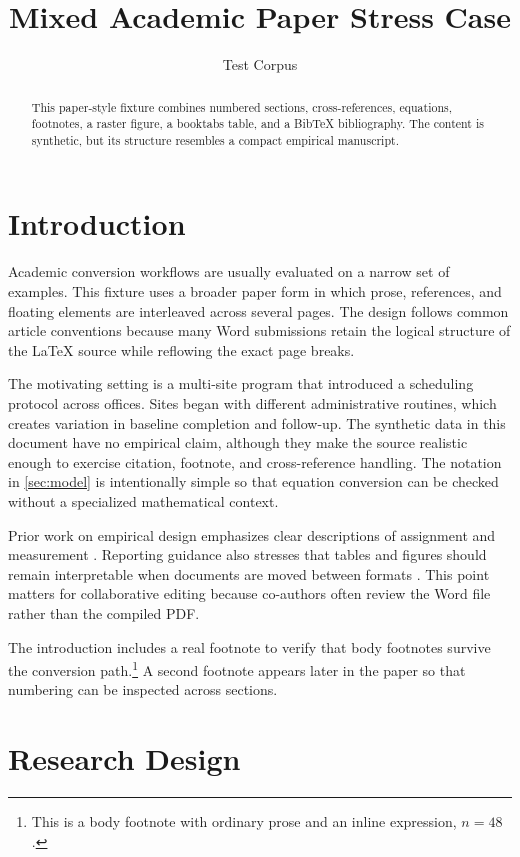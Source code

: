 \documentclass[11pt]{article}
\title{Mixed Academic Paper Stress Case}
\author{Test Corpus}
\date{}
\begin{document}
\maketitle

\begin{abstract}
This paper-style fixture combines numbered sections, cross-references, equations,
footnotes, a raster figure, a booktabs table, and a BibTeX bibliography. The
content is synthetic, but its structure resembles a compact empirical manuscript.
\end{abstract}

\section{Introduction}
\label{sec:introduction}

Academic conversion workflows are usually evaluated on a narrow set of examples.
This fixture uses a broader paper form in which prose, references, and floating
elements are interleaved across several pages. The design follows common article
conventions because many Word submissions retain the logical structure of the
LaTeX source while reflowing the exact page breaks.

The motivating setting is a multi-site program that introduced a scheduling
protocol across offices. Sites began with different administrative routines, which
creates variation in baseline completion and follow-up. The synthetic data in
this document have no empirical claim, although they make the source realistic
enough to exercise citation, footnote, and cross-reference handling. The notation
in \cref{sec:model} is intentionally simple so that equation conversion can be
checked without a specialized mathematical context.

Prior work on empirical design emphasizes clear descriptions of assignment and
measurement \citep{angrist2009mostly}. Reporting guidance also stresses that
tables and figures should remain interpretable when documents are moved between
formats \citep{gentzkow2014code}. This point matters for collaborative editing
because co-authors often review the Word file rather than the compiled PDF.

The introduction includes a real footnote to verify that body footnotes survive
the conversion path.\footnote{This is a body footnote with ordinary prose and an
inline expression, $n=48$.} A second footnote appears later in the paper so that
numbering can be inspected across sections.

\section{Research Design}
\label{sec:design}
\end{document}
